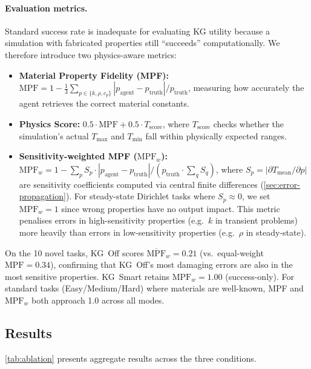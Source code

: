 \documentclass[twocolumn]{article}
\begin{document}
\paragraph{Evaluation metrics.}
Standard success rate is inadequate for evaluating KG utility because
a simulation with fabricated properties still ``succeeds''
computationally.  We therefore introduce two physics-aware metrics:
\begin{itemize}
  \item \textbf{Material Property Fidelity (MPF):}
        $\text{MPF} = 1 - \frac{1}{3}\sum_{p \in \{k,\rho,c_p\}}
        |p_\text{agent} - p_\text{truth}| / p_\text{truth}$, measuring
        how accurately the agent retrieves the correct material constants.
  \item \textbf{Physics Score:} $0.5 \cdot \text{MPF} + 0.5 \cdot
        T_\text{score}$, where $T_\text{score}$ checks whether the
        simulation's actual $T_\text{max}$ and $T_\text{min}$ fall within
        physically expected ranges.
  \item \textbf{Sensitivity-weighted MPF ($\text{MPF}_w$):}
        $\text{MPF}_w = 1 - \sum_{p} S_p \cdot |p_\text{agent} -
        p_\text{truth}| / (p_\text{truth} \cdot \sum_q S_q)$, where
        $S_p = |\partial T_{\text{mean}} / \partial p|$ are sensitivity
        coefficients computed via central finite differences
        (\cref{sec:error-propagation}).
        For steady-state Dirichlet tasks where $S_p \approx 0$, we set
        $\text{MPF}_w{=}1$ since wrong properties have no output impact.
        This metric penalises errors in high-sensitivity properties
        (e.g.\ $k$ in transient problems) more heavily than errors in
        low-sensitivity properties (e.g.\ $\rho$ in steady-state).
\end{itemize}
On the 10 novel tasks, KG~Off scores $\overline{\text{MPF}}_w{=}0.21$
(vs.\ equal-weight $\text{MPF}{=}0.34$), confirming that KG~Off's most
damaging errors are also in the most sensitive properties.
KG~Smart retains $\text{MPF}_w{=}1.00$ (success-only).
For standard tasks (Easy/Medium/Hard) where materials are well-known,
MPF and $\text{MPF}_w$ both approach 1.0 across all modes.

\subsection{Results}

\cref{tab:ablation} presents aggregate results across the three
conditions.
\end{document}
